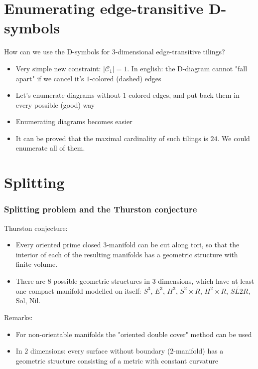 \section{Enumerating edge-transitive D-symbols}
\begin{frame}
  How can we use the D-symbols for $3$-dimensional edge-transitive tilings?
  \begin{itemize}
    \item Very simple new constraint: $|\mathcal{C}_1|=1$. In english: the
      D-diagram cannot "fall apart" if we cancel it's $1$-colored (dashed)
      edges
    \item Let's enumerate diagrams without $1$-colored edges, and put back them
      in every possible (good) way
    \item Enumerating diagrams becomes easier
    \item It can be proved that the maximal cardinality of such tilings is $24$.
      We could enumerate all of them. 
  \end{itemize}
\end{frame}


\section{Splitting}

\begin{frame}
  \frametitle{Splitting problem and the Thurston conjecture}
  Thurston conjecture:
  \begin{itemize}
    \item Every oriented prime closed 3-manifold can be cut along tori, so that
      the interior of each of the resulting manifolds has a geometric structure
      with finite volume.
    \item There are 8 possible geometric structures in 3 dimensions, which have
      at least one compact manifold modelled on itself: $S^3$, $E^3$,
      $H^3$, $S^2\times R$, $H^2\times R$, $\widetilde{SL2R}$, Sol,
      Nil.
  \end{itemize}
  Remarks:
  \begin{itemize}
    \item For non-orientable manifolds the "oriented double cover" method can be
      used
    \item In $2$ dimensions: every surface without boundary (2-manifold) has a
      geometric structure consisting of a metric with constant curvature
  \end{itemize}
\end{frame}

